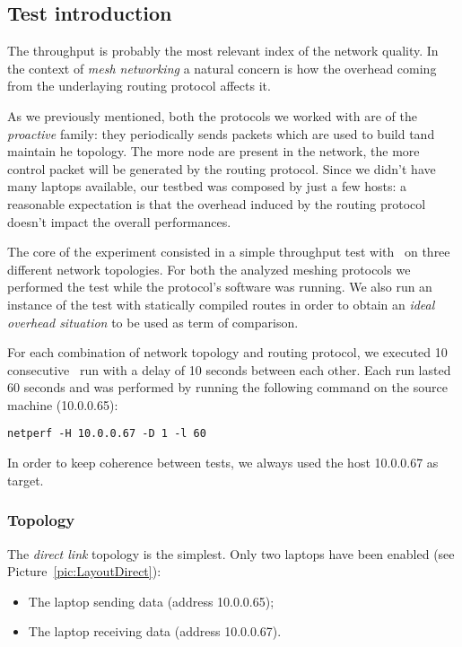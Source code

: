 \subsection{Test introduction}

    The throughput is probably the most relevant index of the network
    quality. In the context of \emph{mesh networking} a natural concern
    is how the overhead coming from the underlaying routing protocol
    affects it.

    As we previously mentioned, both the protocols we worked
    with are of the \emph{proactive} family: they periodically sends
    packets which are used to build tand maintain he topology. The
    more node are present in the network, the more control packet will
    be generated by the routing protocol.
    Since we didn't have many laptops available, our testbed was composed
    by just a few hosts: a reasonable expectation is that the overhead
    induced by the routing protocol doesn't impact the overall
    performances.

    The core of the experiment consisted in a simple throughput test with
    \netperf\ on three different network topologies. For both the
    analyzed meshing protocols we performed the test while the protocol's
    software was running. We also run an instance of the test with
    statically compiled routes in order to obtain an \emph{ideal overhead
    situation} to be used as term of comparison.

    For each combination of network topology and routing protocol, we
    executed 10 consecutive \netperf\ run with a delay of 10 seconds
    between each other. Each run lasted 60 seconds and was performed by
    running the following command on the source machine (10.0.0.65):
\begin{verbatim}
netperf -H 10.0.0.67 -D 1 -l 60
\end{verbatim}

    In order to keep coherence between tests, we always used the host
    10.0.0.67 as target.

    \subsubsection{Topology}

        The \emph{direct link} topology is the simplest. Only two laptops
        have been enabled (see Picture~\ref{pic:LayoutDirect}):
        \begin{itemize}
        \item   The laptop sending data (address 10.0.0.65);
        \item   The laptop receiving data (address 10.0.0.67).
        \end{itemize}

